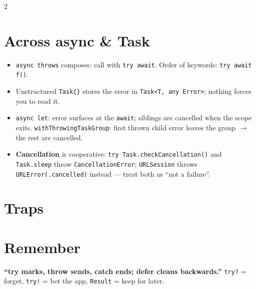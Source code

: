 \documentclass[8pt]{extarticle}
\begin{document}
\begin{multicols}{2}
\section{Across async \& Task}
\begin{itemize}
  \item \texttt{async throws} composes: call with \texttt{try await}. Order of
        keywords: \texttt{try await f()}.
  \item Unstructured \texttt{Task\{\}} stores the error in
        \texttt{Task<T, any Error>}; nothing forces you to read it.
  \item \texttt{async let}: error surfaces at the \texttt{await}; siblings are
        cancelled when the scope exits. \texttt{withThrowingTaskGroup}: first
        thrown child error leaves the group $\to$ the rest are cancelled.
  \item \textbf{Cancellation} is cooperative: \texttt{try Task.checkCancellation()}
        and \texttt{Task.sleep} throw \texttt{CancellationError};
        \texttt{URLSession} throws \texttt{URLError(.cancelled)} instead —
        treat both as ``not a failure''.
\end{itemize}

\section{Traps}
\begin{itemize}
\end{itemize}

\section{Remember}
\textbf{``try marks, throw sends, catch ends; defer cleans backwards.''}
\texttt{try?} = forget, \texttt{try!} = bet the app, \texttt{Result} = keep for later.


\end{multicols}

\end{document}
